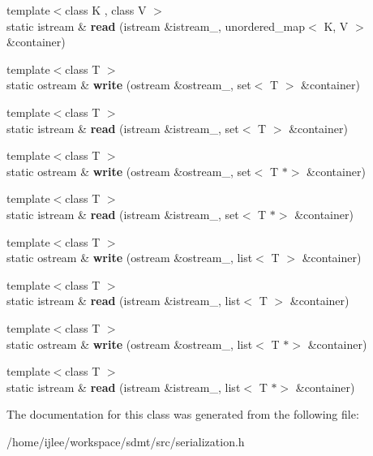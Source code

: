\begin{DoxyCompactItemize}
{\footnotesize template$<$class K , class V $>$ }\\static istream \& {\bfseries read} (istream \&istream\+\_\+, unordered\+\_\+map$<$ K, V $>$ \&container)
\item 
\mbox{\label{classserialize_a1780a15309c9fd5c1b99aa86c6e655e2}} 
{\footnotesize template$<$class T $>$ }\\static ostream \& {\bfseries write} (ostream \&ostream\+\_\+, set$<$ T $>$ \&container)
\item 
\mbox{\label{classserialize_a7bae550a00495e8f4c0d9462293c79fb}} 
{\footnotesize template$<$class T $>$ }\\static istream \& {\bfseries read} (istream \&istream\+\_\+, set$<$ T $>$ \&container)
\item 
\mbox{\label{classserialize_aa319a12913edb58ebca1110e1ac7e8bb}} 
{\footnotesize template$<$class T $>$ }\\static ostream \& {\bfseries write} (ostream \&ostream\+\_\+, set$<$ T $\ast$$>$ \&container)
\item 
\mbox{\label{classserialize_a571493399ed66abf6d0995bb515b5a22}} 
{\footnotesize template$<$class T $>$ }\\static istream \& {\bfseries read} (istream \&istream\+\_\+, set$<$ T $\ast$$>$ \&container)
\item 
\mbox{\label{classserialize_a5b803c97c44afea5120153b909760c14}} 
{\footnotesize template$<$class T $>$ }\\static ostream \& {\bfseries write} (ostream \&ostream\+\_\+, list$<$ T $>$ \&container)
\item 
\mbox{\label{classserialize_aa69ad254f8192475195666626e8b6f51}} 
{\footnotesize template$<$class T $>$ }\\static istream \& {\bfseries read} (istream \&istream\+\_\+, list$<$ T $>$ \&container)
\item 
\mbox{\label{classserialize_ae6785408dae3f1e69e4d5811f0ee66a4}} 
{\footnotesize template$<$class T $>$ }\\static ostream \& {\bfseries write} (ostream \&ostream\+\_\+, list$<$ T $\ast$$>$ \&container)
\item 
\mbox{\label{classserialize_a06514ab5320d9f070ac8739fabeb5b42}} 
{\footnotesize template$<$class T $>$ }\\static istream \& {\bfseries read} (istream \&istream\+\_\+, list$<$ T $\ast$$>$ \&container)
\end{DoxyCompactItemize}


The documentation for this class was generated from the following file\+:\begin{DoxyCompactItemize}
\item 
/home/ijlee/workspace/sdmt/src/serialization.\+h\end{DoxyCompactItemize}
